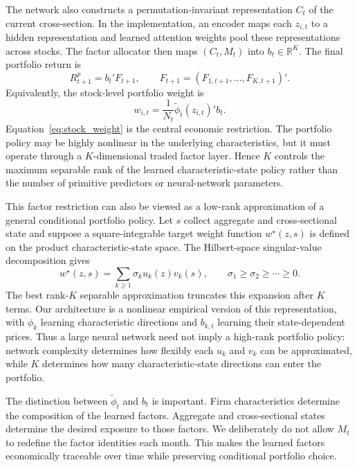 \documentclass[12pt]{article}
\begin{document}
The network also constructs a permutation-invariant representation $C_t$ of the current cross-section. In the implementation, an encoder maps each $z_{i,t}$ to a hidden representation and learned attention weights pool these representations across stocks. The factor allocator then maps $(C_t,M_t)$ into $b_t\in\mathbb{R}^{K}$. The final portfolio return is
\begin{equation}
R^p_{t+1}=b_t'F_{t+1},
\qquad
F_{t+1}=(F_{1,t+1},\ldots,F_{K,t+1})'.
\label{eq:portfolio_factor}
\end{equation}
Equivalently, the stock-level portfolio weight is
\begin{equation}
w_{i,t}=\frac{1}{N_t}\widetilde\phi_t(z_{i,t})'b_t.
\label{eq:stock_weight}
\end{equation}
Equation~\eqref{eq:stock_weight} is the central economic restriction. The portfolio policy may be highly nonlinear in the underlying characteristics, but it must operate through a $K$-dimensional traded factor layer. Hence $K$ controls the maximum separable rank of the learned characteristic-state policy rather than the number of primitive predictors or neural-network parameters.

This factor restriction can also be viewed as a low-rank approximation of a general conditional portfolio policy. Let $s$ collect aggregate and cross-sectional state and suppose a square-integrable target weight function $w^\star(z,s)$ is defined on the product characteristic-state space. The Hilbert-space singular-value decomposition gives
\begin{equation}
w^\star(z,s)=\sum_{k\geq1}\sigma_k u_k(z)v_k(s),
\qquad \sigma_1\geq\sigma_2\geq\cdots\geq0.
\label{eq:schmidt}
\end{equation}
The best rank-$K$ separable approximation truncates this expansion after $K$ terms. Our architecture is a nonlinear empirical version of this representation, with $\phi_k$ learning characteristic directions and $b_{k,t}$ learning their state-dependent prices. Thus a large neural network need not imply a high-rank portfolio policy: network complexity determines how flexibly each $u_k$ and $v_k$ can be approximated, while $K$ determines how many characteristic-state directions can enter the portfolio.

The distinction between $\widetilde\phi_t$ and $b_t$ is important. Firm characteristics determine the composition of the learned factors. Aggregate and cross-sectional states determine the desired exposure to those factors. We deliberately do not allow $M_t$ to redefine the factor identities each month. This makes the learned factors economically traceable over time while preserving conditional portfolio choice.
\end{document}
